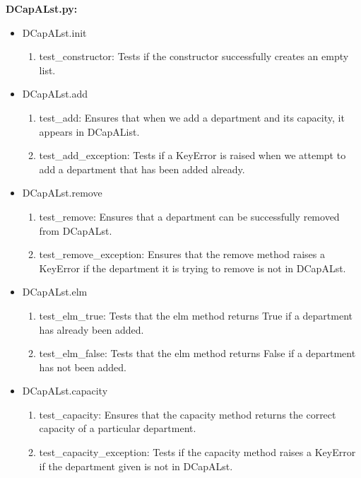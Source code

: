 \documentclass[12pt]{article}
\begin{document}
\textbf{DCapALst.py:}
\begin{itemize}

  \item DCapALst.init
    \begin{enumerate}
      \item test\_constructor: Tests if the constructor successfully creates an empty list.
    \end{enumerate}

  \item DCapALst.add
    \begin{enumerate}
      \item test\_add: Ensures that when we add a department and its capacity, it appears in DCapAList.
      \item test\_add\_exception: Tests if a KeyError is raised when we attempt to add a department that has been added
      already.
    \end{enumerate}

  \item DCapALst.remove
    \begin{enumerate}
      \item test\_remove: Ensures that a department can be successfully removed from DCapALst.
      \item test\_remove\_exception: Ensures that the remove method raises a KeyError if the department it is trying
      to remove is not in DCapALst.
    \end{enumerate}

  \item DCapALst.elm
    \begin{enumerate}
      \item test\_elm\_true: Tests that the elm method returns True if a department has already been added.
      \item test\_elm\_false: Tests that the elm method returns False if a department has not been added.
    \end{enumerate}

  \item DCapALst.capacity
    \begin{enumerate}
      \item test\_capacity: Ensures that the capacity method returns the correct capacity of a particular department.
      \item test\_capacity\_exception: Tests if the capacity method raises a KeyError if the department given is
      not in DCapALst.
    \end{enumerate}

\end{itemize}
\medskip
\end{document}
